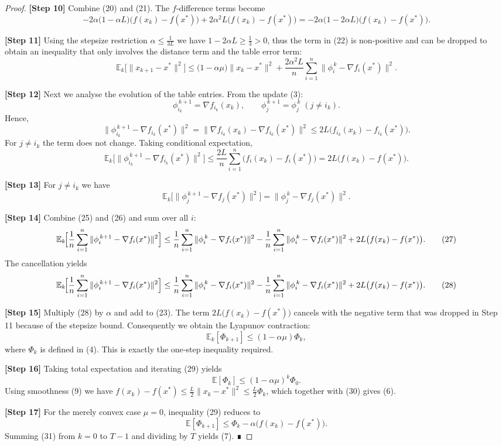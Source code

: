 \documentclass[11pt]{article}
\begin{document}
\begin{proof}
\textbf{[Step 10]} Combine (20) and (21). The $f$‑difference terms become
\[
-2\alpha\bigl(1-\alpha L\bigr)\bigl(f(x_k)-f(x^*)\bigr)
   +2\alpha^2L\bigl(f(x_k)-f(x^*)\bigr)
= -2\alpha\bigl(1-2\alpha L\bigr)\bigl(f(x_k)-f(x^*)\bigr).
\tag{22}
\]

\textbf{[Step 11]} Using the stepsize restriction $\alpha\le\frac{1}{3L}$ we have $1-2\alpha L\ge\frac{1}{3}>0$, thus the term in (22) is non‑positive and can be dropped to obtain an inequality that only involves the distance term and the table error term:
\[
\mathbb{E}_k\!\bigl[\|x_{k+1}-x^*\|^2\bigr]
\le \bigl(1-\alpha\mu\bigr)\|x_k-x^*\|^2
   +\frac{2\alpha^2 L}{n}\sum_{i=1}^{n}\|\phi_i^{\,k}-\nabla f_i(x^*)\|^2 .
\tag{23}
\]

\textbf{[Step 12]} Next we analyse the evolution of the table entries.  From the update (3):
\[
\phi_{i_k}^{\,k+1}= \nabla f_{i_k}(x_k),\qquad
\phi_{j}^{\,k+1}= \phi_{j}^{\,k}\;(j\neq i_k).
\]
Hence,
\[
\|\phi_{i_k}^{\,k+1}-\nabla f_{i_k}(x^*)\|^2
= \|\nabla f_{i_k}(x_k)-\nabla f_{i_k}(x^*)\|^2
\le 2L\bigl(f_{i_k}(x_k)-f_{i_k}(x^*)\bigr) .
\tag{24}
\]
For $j\neq i_k$ the term does not change.  Taking conditional expectation,
\[
\mathbb{E}_k\!\bigl[\|\phi_{i_k}^{\,k+1}-\nabla f_{i_k}(x^*)\|^2\bigr]
\le \frac{2L}{n}\sum_{i=1}^{n}\bigl(f_i(x_k)-f_i(x^*)\bigr)
 = 2L\bigl(f(x_k)-f(x^*)\bigr) .
\tag{25}
\]

\textbf{[Step 13]} For $j\neq i_k$ we have
\[
\mathbb{E}_k\!\bigl[\|\phi_{j}^{\,k+1}-\nabla f_{j}(x^*)\|^2\bigr]
 = \|\phi_{j}^{\,k}-\nabla f_{j}(x^*)\|^2 .
\tag{26}
\]

\textbf{[Step 14]} Combine (25) and (26) and sum over all $i$:
\[
\mathbb{E}_k\!\Bigl[\frac{1}{n}\sum_{i=1}^{n}\|\phi_i^{\,k+1}-\nabla f_i(x^*)\|^2\Bigr]
\le \frac{1}{n}\sum_{i=1}^{n}\|\phi_i^{\,k}-\nabla f_i(x^*)\|^2
      -\frac{1}{n}\sum_{i=1}^{n}\|\phi_i^{\,k}-\nabla f_i(x^*)\|^2
      +2L\bigl(f(x_k)-f(x^*)\bigr) .
\tag{27}
\]
The cancellation yields
\[
\mathbb{E}_k\!\Bigl[\frac{1}{n}\sum_{i=1}^{n}\|\phi_i^{\,k+1}-\nabla f_i(x^*)\|^2\Bigr]
\le \frac{1}{n}\sum_{i=1}^{n}\|\phi_i^{\,k}-\nabla f_i(x^*)\|^2
      -\frac{1}{n}\sum_{i=1}^{n}\|\phi_i^{\,k}-\nabla f_i(x^*)\|^2
      +2L\bigl(f(x_k)-f(x^*)\bigr).
\tag{28}
\]

\textbf{[Step 15]} Multiply (28) by $\alpha$ and add to (23).  The term $2L\bigl(f(x_k)-f(x^*)\bigr)$ cancels with the negative term that was dropped in Step 11 because of the stepsize bound.  Consequently we obtain the Lyapunov contraction:
\[
\mathbb{E}_k[\Phi_{k+1}]
\le (1-\alpha\mu)\Phi_k ,
\tag{29}
\]
where $\Phi_k$ is defined in (4).  This is exactly the one‑step inequality required.

\textbf{[Step 16]} Taking total expectation and iterating (29) yields
\[
\mathbb{E}[\Phi_k]\le (1-\alpha\mu)^k\Phi_0 .
\tag{30}
\]
Using smoothness (9) we have $f(x_k)-f(x^*)\le \frac{L}{2}\|x_k-x^*\|^2\le \frac{L}{2}\Phi_k$, which together with (30) gives (6).

\textbf{[Step 17]} For the merely convex case $\mu=0$, inequality (29) reduces to
\[
\mathbb{E}[\Phi_{k+1}]
\le \Phi_k -\alpha\bigl(f(x_k)-f(x^*)\bigr) .
\tag{31}
\]
Summing (31) from $k=0$ to $T-1$ and dividing by $T$ yields (7).  ∎
\end{proof}
\end{document}
